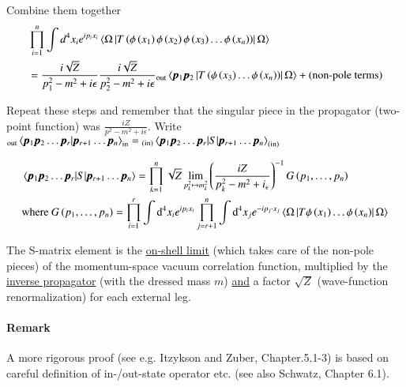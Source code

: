 Combine them together
\begin{align}
   &\prod_{i=1}^{n} \int d^{4} x_{i} e^{i p_{i} x_{i}}\left\langle\Omega\left| T\left(\phi\left(x_{1}\right) \phi\left(x_{2}\right) \phi\left(x_{3}\right) \dots \phi\left(x_{n}\right)\right) \right| \Omega \right\rangle \notag \\ 
   &=\frac{i \sqrt{Z}}{p_{1}^{2}-m^{2}+i \epsilon} \frac{i \sqrt{Z}}{p^{2}_2-m^{2}+i \epsilon} {}_{\text{out}} \left\langle \pmb{p}_1 \pmb{p}_2 \left| T\left(\phi\left(x_{3}\right) \dots \phi\left(x_{n}\right)\right) \right| \Omega \right\rangle + (\text{non-pole terms})
\end{align}

Repeat these steps and remember that the singular piece in the propagator (two-point function) was $\frac{iZ}{p^2 - m^2 + i\epsilon}$. Write ${}_{\text{out}} \braket{\pmb{p}_1 \pmb{p}_2 \dots \pmb{p}_r | \pmb{p}_{r+1} \dots \pmb{p}_n }_{\text{in}} = {}_{(\text{in})}\braket{\pmb{p}_1 \pmb{p}_2 \dots \pmb{p}_r |S| \pmb{p}_{r+1} \dots \pmb{p}_n }_{(\text{in})}$

\begin{align}
   &\left\langle \pmb{p}_{1} \pmb{p}_{2} \dots \pmb{p}_{r}|S|\pmb{p}_{r+1} \dots \pmb{p}_{n}\right\rangle=\prod_{k=1}^{n} \sqrt{Z} \lim _{p_{k}^{2} \mapsto m_{k}^{2}}\left(\frac{i Z}{p_{k}^{2}-m^{2}+i_{\epsilon}}\right)^{-1} G\left(p_{1}, \dots, p_{n}\right) \notag\\ 
   &\text{where } G\left(p_{1}, \dots, p_{n}\right)=\prod_{i=1}^{r} \int \dd^{4} x_{i} e^{i p_{i} x_{i}} \prod_{j=r+1}^{n} \int \dd^{4} x_{j} e^{-i p_{j} \cdot x_{j}}\left\langle\Omega\left|T \phi\left(x_{1}\right) \dots \phi\left(x_{n}\right)\right| \Omega\right\rangle
\end{align}

The S-matrix element is the \underline{on-shell limit} (which takes care of the non-pole pieces) of the momentum-space vacuum correlation function, multiplied by the \underline{inverse propagator} (with the dressed mass $m$) \underline{and} a factor $\sqrt{Z}$ (wave-function renormalization) for each external leg.

\paragraph{Remark} A more rigorous proof (see e.g. Itzykson and Zuber, Chapter.5.1-3) is based on careful definition of in-/out-state operator etc. (see also Schwatz, Chapter 6.1).

